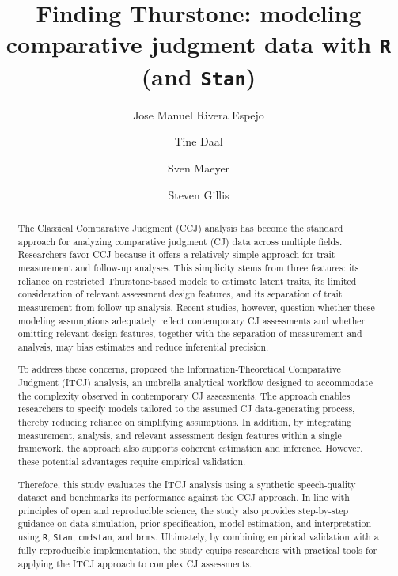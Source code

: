 \documentclass[
  authoryear,
  review,
  1p]{elsarticle}
\begin{document}
\begin{frontmatter}
\title{Finding Thurstone: modeling comparative judgment data with
\texttt{R} (and \texttt{Stan})}
\author[1]{Jose Manuel Rivera Espejo%
%
}
\author[1]{Tine Daal%
%
}
\author[1]{Sven Maeyer%
%
}
\author[2]{Steven Gillis%
%
}






        
\begin{abstract}
The Classical Comparative Judgment (CCJ) analysis has become the
standard approach for analyzing comparative judgment (CJ) data across
multiple fields. Researchers favor CCJ because it offers a relatively
simple approach for trait measurement and follow-up analyses. This
simplicity stems from three features: its reliance on restricted
Thurstone-based models to estimate latent traits, its limited
consideration of relevant assessment design features, and its separation
of trait measurement from follow-up analysis. Recent studies, however,
question whether these modeling assumptions adequately reflect
contemporary CJ assessments and whether omitting relevant design
features, together with the separation of measurement and analysis, may
bias estimates and reduce inferential precision.

To address these concerns, \citet{Rivera_et_al_2025} proposed the
Information-Theoretical Comparative Judgment (ITCJ) analysis, an
umbrella analytical workflow designed to accommodate the complexity
observed in contemporary CJ assessments. The approach enables
researchers to specify models tailored to the assumed CJ data-generating
process, thereby reducing reliance on simplifying assumptions. In
addition, by integrating measurement, analysis, and relevant assessment
design features within a single framework, the approach also supports
coherent estimation and inference. However, these potential advantages
require empirical validation.

Therefore, this study evaluates the ITCJ analysis using a synthetic
speech-quality dataset and benchmarks its performance against the CCJ
approach. In line with principles of open and reproducible science, the
study also provides step-by-step guidance on data simulation, prior
specification, model estimation, and interpretation using \texttt{R},
\texttt{Stan}, \texttt{cmdstan}, and \texttt{brms}. Ultimately, by
combining empirical validation with a fully reproducible implementation,
the study equips researchers with practical tools for applying the ITCJ
approach to complex CJ assessments.
\end{abstract}






\end{frontmatter}
\end{document}
